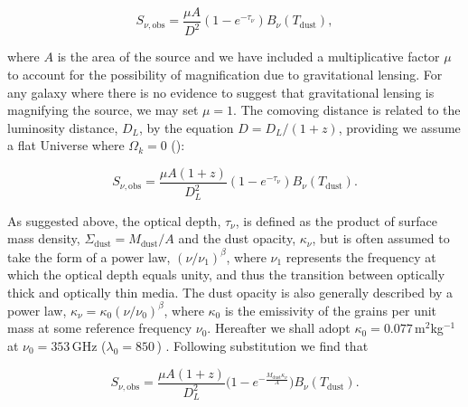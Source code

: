 \begin{equation}
	S_{\nu, \textrm{obs}} = \frac{\mu A}{D^2}(1 - e^{-\tau_\nu}) B_\nu(T_{\textrm{dust}}),
\label{eq:modified_blackbody_area}
\end{equation}

where $A$ is the area of the source and we have included a multiplicative factor $\mu$ to account for the possibility of magnification due to gravitational lensing. For any galaxy where there is no evidence to suggest that gravitational lensing is magnifying the source, we may set $\mu = 1$. The comoving distance is related to the luminosity distance, $D_L$, by the equation $D = D_L/(1+z)$, providing we assume a flat Universe where $\Omega_k = 0$ (\citealt{Hogg_1999}):

\begin{equation}
	S_{\nu, \textrm{obs}} = \frac{\mu A (1+z)}{D_L^2}(1 - e^{-\tau_\nu}) B_\nu(T_{\textrm{dust}}).
	\label{eq:modified_blackbody_area_dl}
\end{equation}

As suggested above, the optical depth, $\tau_\nu$, is defined as the product of surface mass density, $\Sigma_{\textrm{dust}} = M_{\textrm{dust}}/A$ and the dust opacity, $\kappa_\nu$, but is often assumed to take the form of a power law, $(\nu/\nu_1)^\beta$, where $\nu_1$ represents the frequency at which the optical depth equals unity, and thus the transition between optically thick and optically thin media. The dust opacity is also generally described by a power law, $\kappa_\nu = \kappa_0(\nu/\nu_0)^\beta$, where $\kappa_0$ is the emissivity of the grains per unit mass at some reference frequency $\nu_0$. Hereafter we shall adopt $\kappa_0 = 0.077$\,m$^2$kg$^{-1}$ at $\nu_0 = 353$\,GHz ($\lambda_0 = 850$\,\micron) . Following substitution we find that

\begin{equation}
	S_{\nu, \textrm{obs}} = \frac{\mu A (1+z)}{D_L^2}\Bigg(1 - e^{- \frac{M_{\textrm{dust}}\kappa_\nu}{A}}\Bigg) B_\nu(T_{\textrm{dust}}).
	\label{eq:modified_blackbody_general_opacity_a}
\end{equation}

